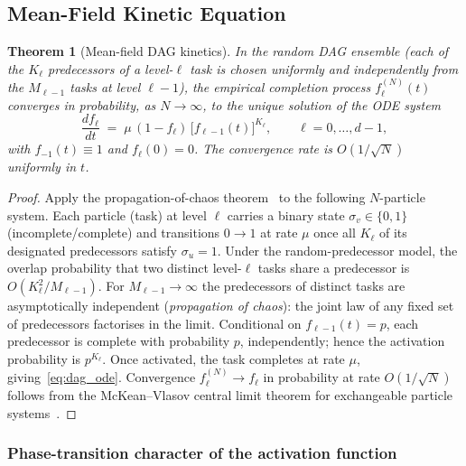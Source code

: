\documentclass[11pt,a4paper]{article}
\newtheorem{theorem}{Theorem}[section]
\begin{document}
\subsection{Mean-Field Kinetic Equation}

\begin{theorem}[Mean-field DAG kinetics]\label{thm:dag_ode}
In the random DAG ensemble (each of the $K_\ell$ predecessors of a level-$\ell$
task is chosen uniformly and independently from the $M_{\ell-1}$ tasks at
level $\ell{-}1$), the empirical completion process $f_\ell^{(N)}(t)$
converges in probability, as $N \to \infty$, to the unique solution of the ODE
system
\begin{equation}\label{eq:dag_ode}
  \frac{d f_\ell}{dt}
  \;=\; \mu\,(1 - f_\ell)\,\bigl[f_{\ell-1}(t)\bigr]^{K_\ell},
  \qquad \ell = 0, \ldots, d-1,
\end{equation}
with $f_{-1}(t) \equiv 1$ and $f_\ell(0) = 0$.
The convergence rate is $O(1/\sqrt{N})$ uniformly in $t$.
\end{theorem}

\begin{proof}
Apply the propagation-of-chaos theorem~\cite{sznitman1991} to the following
$N$-particle system.
Each particle (task) at level $\ell$ carries a binary state
$\sigma_v \in \{0,1\}$ (incomplete/complete) and transitions $0 \to 1$
at rate $\mu$ once all $K_\ell$ of its designated predecessors satisfy
$\sigma_u = 1$.
Under the random-predecessor model, the overlap probability that two distinct
level-$\ell$ tasks share a predecessor is $O(K_\ell^2 / M_{\ell-1})$.
For $M_{\ell-1} \to \infty$ the predecessors of distinct tasks are
asymptotically independent (\emph{propagation of chaos}):
the joint law of any fixed set of predecessors factorises in the limit.
Conditional on $f_{\ell-1}(t) = p$, each predecessor is complete with
probability $p$, independently; hence the activation probability is $p^{K_\ell}$.
Once activated, the task completes at rate $\mu$, giving~\eqref{eq:dag_ode}.
Convergence $f_\ell^{(N)} \to f_\ell$ in probability at rate $O(1/\sqrt{N})$
follows from the McKean--Vlasov central limit theorem for exchangeable particle
systems~\cite{sznitman1991}.
\end{proof}

\subsubsection{Phase-transition character of the activation function}
\end{document}

